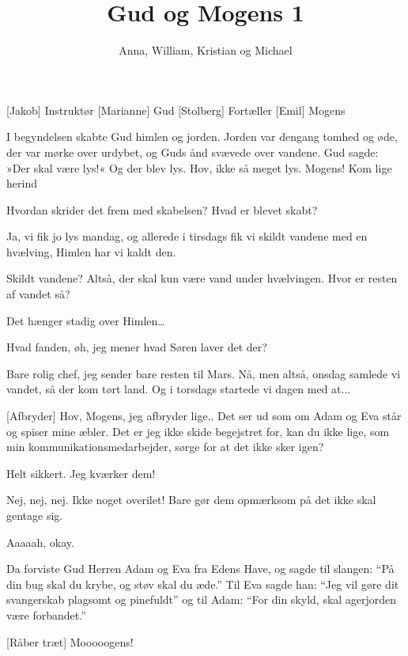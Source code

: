 \documentclass[a4paper,11pt]{article}
\title{Gud og Mogens 1}
\author{Anna, William, Kristian og Michael}
\begin{document}
\maketitle

\begin{roles}
[Jakob] Instruktør
[Marianne] Gud
[Stolberg] Fortæller
[Emil] Mogens
\end{roles}


  
\begin{sketch}

 I begyndelsen skabte Gud himlen og jorden. Jorden var dengang tomhed og øde, der var mørke over urdybet, og Guds ånd svævede over vandene. Gud sagde: »Der skal være lys!« Og der blev lys.
 Hov, ikke så meget lys.
 Mogens! Kom lige herind


 Hvordan skrider det frem med skabelsen? Hvad er blevet skabt?

 Ja, vi fik jo lys mandag, og allerede i tirsdags fik vi skildt vandene med en hvælving, Himlen har vi kaldt den.

 Skildt vandene? Altså, der skal kun være vand under hvælvingen. Hvor er resten af vandet så?

 Det hænger stadig over Himlen…

 Hvad fanden, øh, jeg mener hvad Søren laver det der?

 Bare rolig chef, jeg sender bare resten til Mars.  Nå, men altså, onsdag samlede vi vandet, så der kom tørt land. Og i torsdags startede vi dagen med at... 

[Afbryder] Hov, Mogens, jeg afbryder lige.. Det ser ud som om Adam og Eva står og spiser mine æbler. Det er jeg ikke skide begejstret for, kan du ikke lige, som min kommunikationsmedarbejder, sørge for at det ikke sker igen? 

 Helt sikkert. Jeg kværker dem!

 Nej, nej, nej. Ikke noget overilet! Bare gør dem opmærksom på det ikke skal gentage sig.

 Aaaaah, okay. 

 Da forviste Gud Herren Adam og Eva fra Edens Have, og sagde til slangen: “På din bug skal du krybe, og støv skal du æde.” Til Eva sagde han: “Jeg vil gøre dit svangerskab plagsomt og pinefuldt” og til Adam: “For din skyld, skal agerjorden være forbandet.”

[Råber træt] Mooooogens! 



\end{sketch}
\end{document}
